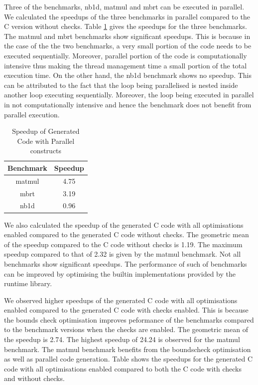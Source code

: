Three of the \matlab benchmarks, nb1d, matmul and mbrt can be executed in parallel. We calculated the speedups of the three benchmarks in parallel compared to the C version without checks. Table \ref{tab:cpvscwo} gives the speedups for the three benchmarks. The matmul and mbrt benchmarks show significant speedups. This is because in the case of the the two benchmarks, a very small portion of the code needs to be executed sequentially. Moreover, parallel portion of the code is computationally intensive thus making the thread management time a small portion of the total execution time. On the other hand, the nb1d benchmark shows no speedup. This can be attributed to the fact that the loop being parallelised is nested inside another loop executing sequentially. Moreover, the loop being executed in parallel in not computationally intensive and hence the benchmark does not benefit from parallel execution. 
\begin{table}[htbp]
\centering
\begin{tabular}{|c|c|}
\hline
Benchmark & Speedup \\ \hline
matmul    & 4.75    \\ \hline
mbrt      & 3.19    \\ \hline
nb1d      & 0.96    \\ \hline
\end{tabular}
\caption{Speedup of Generated Code with Parallel constructs}
\label{tab:cpvscwo}
\end{table}

We also calculated the speedup of the generated C code with all optimisations enabled compared to the generated C code without checks. The geometric mean of the speedup compared to the C code without checks is 1.19. The maximum speedup compared to that of  2.32 is given by the matmul benchmark. Not all benchmarks show significant speedups. The performance of such of benchmarks can be improved by optimising the builtin implementations provided by the runtime library.

We observed higher speedups of the generated C code with all optimisations enabled compared to the generated C code with checks enabled. This is because the bounds check optimisation improves peformance of the benchmarks compared to the benchmark versions when the checks are enabled. The geometric mean of the speedup is 2.74. The highest speedup of 24.24 is observed for the matmul benchmark. The matmul benchmark benefits from the boundscheck optimisation as well as parallel code generation. Table %
shows the speedups for the generated C code with all optimisations enabled compared to both the C code with checks and without checks. 
